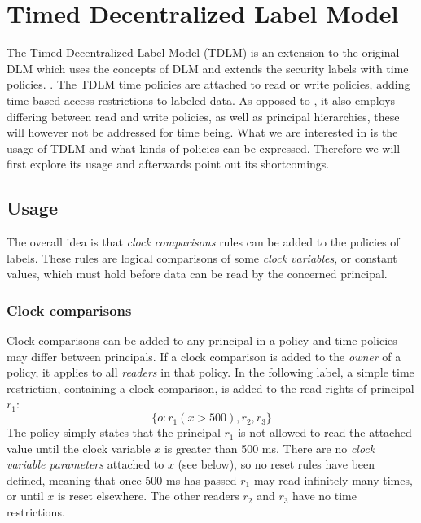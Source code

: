 
\newcommand{\tat}{\;@\;} %
\newcommand{\tdor}{\;||\;} %

\section{Timed Decentralized Label Model}
The Timed Decentralized Label Model (TDLM) is an extension to the original DLM which uses the concepts of DLM and extends the security labels with time policies. \cite{pedersen2015}.
The TDLM time policies are attached to read or write policies, adding time-based access restrictions to labeled data.
As opposed to \thetool, it also employs differing between read and write policies, as well as principal hierarchies, these will however not be addressed for time being.
What we are interested in is the usage of TDLM and what kinds of policies can be expressed.
Therefore we will first explore its usage and afterwards point out its shortcomings.

\subsection{Usage}
The overall idea is that \emph{clock comparisons} rules can be added to the policies of labels.
These rules are logical comparisons of some \emph{clock variables}, or constant values, which must hold before data can be read by the concerned principal.

\subsubsection{Clock comparisons}
Clock comparisons can be added to any principal in a policy and time policies may differ between principals.
If a clock comparison is added to the \emph{owner} of a policy, it applies to all \emph{readers} in that policy.
In the following label, a simple time restriction, containing a clock comparison, is added to the read rights of principal $r_1$:
  \[ \{ o : r_1(x > 500), r_2, r_3 \} \]
The policy simply states that the principal $r_1$ is not allowed to read the attached value until the clock variable $x$ is greater than 500 ms.
There are no \emph{clock variable parameters} attached to $x$ (see below), so no reset rules have been defined, meaning that once 500 ms has passed $r_1$ may read infinitely many times, or until $x$ is reset elsewhere.
The other readers $r_2$ and $r_3$ have no time restrictions.


